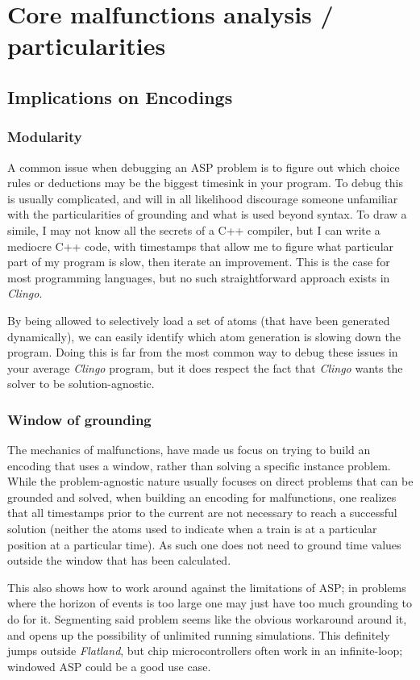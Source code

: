 \section{Core malfunctions analysis / particularities}
\subsection{Implications on Encodings}

\subsubsection{Modularity}
A common issue when debugging an ASP problem is to figure out which choice rules or deductions may be the biggest timesink in your program. To debug this is usually complicated, and will in all likelihood discourage someone unfamiliar with the particularities of grounding and what is used beyond syntax. To draw a simile, I may not know all the secrets of a C++ compiler, but I can write a mediocre C++ code, with timestamps that allow me to figure what particular part of my program is slow, then iterate an improvement. This is the case for most programming languages, but no such straightforward approach exists in \textit{Clingo}.

By being allowed to selectively load a set of atoms (that have been generated dynamically), we can easily identify which atom generation is slowing down the program. Doing this is far from the most common way to debug these issues in your average \textit{Clingo} program, but it does respect the fact that \textit{Clingo} wants the solver to be solution-agnostic. 


\subsubsection{Window of grounding}
\label{sec:window}
The mechanics of malfunctions, have made us focus on trying to build an encoding that uses a window, rather than solving a specific instance problem. While the problem-agnostic nature usually focuses on direct problems that can be grounded and solved, when building an encoding for malfunctions, one realizes that all timestamps prior to the current are not necessary to reach a successful solution (neither the atoms used to indicate when a train is at a particular position at a particular time). As such one does not need to ground time values outside the window that has been calculated.

This also shows how to work around against the limitations of ASP; in problems where the horizon of events is too large one may just have too much grounding to do for it. Segmenting said problem seems like the obvious workaround around it, and opens up the possibility of unlimited running simulations. This definitely jumps outside \textit{Flatland}, but chip microcontrollers often work in an infinite-loop; windowed ASP could be a good use case.
  

